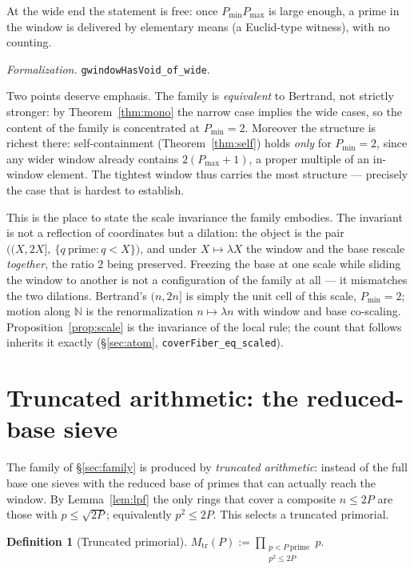 \documentclass[11pt,a4paper]{amsart}
\theoremstyle{plain}
\theoremstyle{definition}
\newtheorem{definition}[theorem]{Definition}
\theoremstyle{plain}
\theoremstyle{remark}
\newcommand{\lean}[1]{\textup{\texttt{#1}}}
\newcommand{\Formal}[1]{\par\smallskip\noindent\emph{Formalization.} #1\par\smallskip}
\begin{document}
At the wide end the statement is free: once $P_{\min}P_{\max}$ is large enough, a prime in
the window is delivered by elementary means (a Euclid-type witness), with no counting.

\Formal{\lean{gwindowHasVoid\_of\_wide}.}

Two points deserve emphasis. The family is \emph{equivalent} to Bertrand, not strictly
stronger: by Theorem~\ref{thm:mono} the narrow case implies the wide cases, so the content of
the family is concentrated at $P_{\min}=2$. Moreover the structure is richest there:
self-containment (Theorem~\ref{thm:self}) holds \emph{only} for $P_{\min}=2$, since any wider
window already contains $2(P_{\max}+1)$, a proper multiple of an in-window element. The tightest
window thus carries the most structure --- precisely the case that is hardest to establish.

This is the place to state the scale invariance the family embodies. The invariant is not
a reflection of coordinates but a dilation: the object is the pair
$\big((X,2X],\ \{q\ \text{prime}:q<X\}\big)$, and under $X\mapsto\lambda X$ the window and
the base rescale \emph{together}, the ratio $2$ being preserved. Freezing the base at one
scale while sliding the window to another is not a configuration of the family at all ---
it mismatches the two dilations. Bertrand's $(n,2n]$ is simply the unit cell of this scale,
$P_{\min}=2$; motion along $\mathbb{N}$ is the renormalization $n\mapsto\lambda n$ with
window and base co-scaling. Proposition~\ref{prop:scale} is the invariance of the local
rule; the count that follows inherits it exactly (\S\ref{sec:atom},
\lean{coverFiber\_eq\_scaled}).

\section{Truncated arithmetic: the reduced-base sieve}
\label{sec:trunc}

The family of \S\ref{sec:family} is produced by \emph{truncated arithmetic}: instead of
the full base one sieves with the reduced base of primes that can actually reach the
window. By Lemma~\ref{lem:lpf} the only rings that cover a composite $n\le 2P$ are those
with $p\le\sqrt{2P}$; equivalently $p^2\le 2P$. This selects a truncated primorial.

\begin{definition}[Truncated primorial]
$\displaystyle M_{\mathrm{tr}}(P):=\prod_{\substack{p<P\ \text{prime}\\ p^2\le 2P}}p.$
\end{definition}
\end{document}

